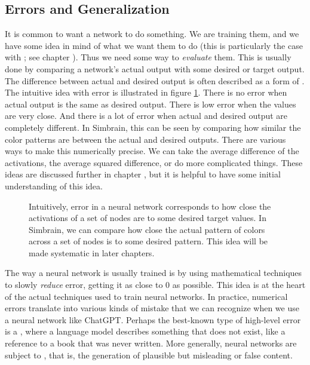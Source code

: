 \subsection{Errors and Generalization}\label{evaluatingNN}

It is common to want a network to do something. We are training them, and we have some idea in mind of what we want them to do (this is particularly the case with ; see chapter ). Thus we need some way to \emph{evaluate} them. This is usually done by comparing a network's actual output with some desired or target output. The difference between actual and desired output is often described as a form of . The intuitive idea with error is illustrated in figure \ref{intuitiveError}. There is no error when actual output is the same as desired output. There is low error when the values are very close. And there is a lot of error when actual and desired output are completely different. In Simbrain, this can be seen by comparing how similar the color patterns are between the actual and desired outputs. There are various ways to make this numerically precise. We can take the average difference of the activations, the average squared difference, or do more complicated things. These ideas are discussed further in chapter , but it is helpful to have some initial understanding of this idea. 

\begin{figure}[h]
\centering
{}
\caption[Jeff Yoshimi.]{Intuitively, error in a neural network corresponds to how close the activations of a set of nodes are to some desired target values. In Simbrain, we can compare how close the actual pattern of colors across a set of nodes is to some desired pattern. This idea will be made systematic in later chapters.}
\label{intuitiveError}
\end{figure}

The way a neural network is usually trained is by using mathematical techniques to slowly \emph{reduce} error, getting it as close to 0 as possible. This idea is at the heart of the actual techniques used to train neural networks. In practice, numerical errors translate into various kinds of mistake that we can recognize when we use a neural network like ChatGPT. Perhaps the best-known type of high-level error is a , where a language model describes something that does not exist, like a reference to a book that was never written.  More generally, neural networks are subject to , that is, the generation of plausible but misleading or false content.

